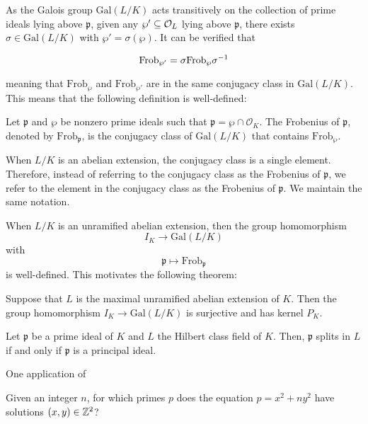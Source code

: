 As the Galois group $\textrm{Gal}(L/K)$ acts transitively on the collection of prime ideals lying above $\mathfrak{p}$, given any $\wp' \subseteq \mathcal{O}_{L}$ lying above $\mathfrak{p}$, there exists $\sigma \in \textrm{Gal}(L/K)$ with $\wp' = \sigma(\wp)$. It can be verified that

\[\textrm{Frob}_{\wp'} = \sigma \textrm{Frob}_\wp\sigma^{-1}\]

meaning that $\textrm{Frob}_{\wp}$ and $\textrm{Frob}_{\wp'}$ are in the same conjugacy class in $\textrm{Gal}(L/K)$. This means that the following definition is well-defined:

\begin{definition}
    Let $\mathfrak{p}$ and $\wp$ be nonzero prime ideals such that $\mathfrak{p} = \wp\cap \mathcal{O}_{K}$. The Frobenius of $\mathfrak{p}$, denoted by $\textrm{Frob}_{\mathfrak{p}}$, is the conjugacy class of $\textrm{Gal}(L/K)$ that contains $\textrm{Frob}_\wp$.
\end{definition}

When $L/K$ is an abelian extension, the conjugacy class is a single element. Therefore, instead of referring to the conjugacy class as the Frobenius of $\mathfrak{p}$, we refer to the element in the conjugacy class as the Frobenius of $\mathfrak{p}$. We maintain the same notation.

When $L/K$ is an unramified abelian extension, then the group homomorphism
    \[I_K \to \textrm{Gal}(L/K)\]
with
    \[\mathfrak{p} \mapsto \textrm{Frob}_{\mathfrak{p}}\]
is well-defined. This motivates the following theorem:

\begin{theorem}
    Suppose that $L$ is the maximal unramified abelian extension of $K$. Then the group homomorphism $I_K \to \textrm{Gal}(L/K)$ is surjective and has kernel $P_K$.
\end{theorem}

\begin{corollary}
    Let $\mathfrak{p}$ be a prime ideal of $K$ and $L$ the Hilbert class field of $K$. Then, $\mathfrak{p}$ splits in $L$ if and only if $\mathfrak{p}$ is a principal ideal.
\end{corollary}

One application of %

Given an integer $n$, for which primes $p$ does the equation $p = x^2 + ny^2$ have solutions $(x,y) \in \mathbb{Z}^2$?
